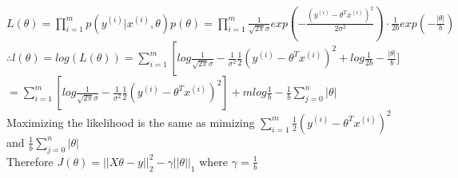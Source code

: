 \begin{answer}\\
$L(\theta)=\prod_{i=1}^{m}p(y^{(i)}|x^{(i)},\theta)p(\theta)=\prod_{i=1}^{m}\frac{1}{\sqrt{2 \pi}\sigma}exp(-\frac{(y^{(i)}-\theta^T x^{(i)})^2}{2 \sigma^2}) \cdot \frac{1}{2b}exp(-\frac{|\theta|}{b})$\\
$\therefore l(\theta)=log(L(\theta))=\sum_{i=1}^{m}\left [ log \frac{1}{\sqrt{2 \pi} \sigma}-\frac{1}{\sigma^2}\frac{1}{2}(y^{(i)}-\theta^T x^{(i)})^2 + log \frac{1}{2b} -\frac{|\theta|}{b}]$\\
$=\sum_{i=1}^{m}\left [ log \frac{1}{\sqrt{2 \pi} \sigma}-\frac{1}{\sigma^2}\frac{1}{2}(y^{(i)}-\theta^T x^{(i)})^2 \right ] + m log \frac{1}{b} - \frac{1}{b}\sum_{j=0}^{n}|\theta|$\\
Maximizing the likelihood is the same as mimizing $\sum_{i=1}^{m}\frac{1}{2}(y^{(i)}-\theta^T x^{(i)})^2$ and $\frac{1}{b}\sum_{j=0}^{n}|\theta|$\\
Therefore $J(\theta)=||X\theta-y||_2^2-\gamma||\theta||_1$
where $\gamma=\frac{1}{b}$
\end{answer}
